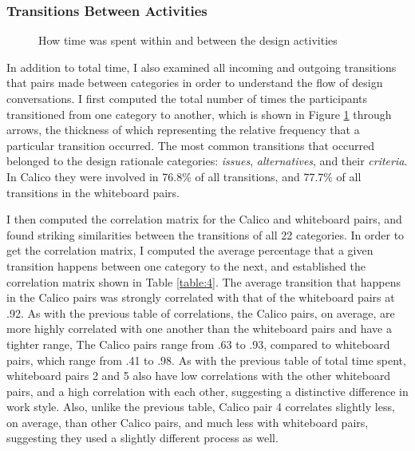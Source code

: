 \subsubsection {Transitions Between Activities}
\label{results:32}

\begin{figure}
\caption{How time was spent within and between the design activities}
\label{fig:13}      
\end{figure}
%

In addition to total time, I also examined all incoming and outgoing transitions that pairs made between categories in order to understand the flow of design conversations. I first computed the total number of times the participants transitioned from one category to another, which is shown in Figure \ref{fig:13} through arrows, the thickness of which representing the relative frequency that a particular transition occurred. The most common transitions that occurred belonged to the design rationale categories: \emph{issues}, \emph{alternatives}, and their \emph{criteria}. In Calico they were involved in 76.8\% of all transitions, and 77.7\% of all transitions in the whiteboard pairs. 

I then computed the correlation matrix for the Calico and whiteboard pairs, and found striking similarities between the transitions of all 22 categories. In order to get the correlation matrix, I computed the average percentage that a given transition happens between one category to the next, and established the correlation matrix shown in Table \ref{table:4}. The average transition that happens in the Calico pairs was strongly correlated with that of the whiteboard pairs at .92. As with the previous table of correlations, the Calico pairs, on average, are more highly correlated with one another than the whiteboard pairs and have a tighter range, The Calico pairs range from .63 to .93, compared to whiteboard pairs, which range from .41 to .98. As with the previous table of total time spent, whiteboard pairs 2 and 5 also have low correlations with the other whiteboard pairs, and a high correlation with each other, suggesting a distinctive difference in work style. Also, unlike the previous table, Calico pair 4 correlates slightly less, on average, than other Calico pairs, and much less with whiteboard pairs, suggesting they used a slightly different process as well.

